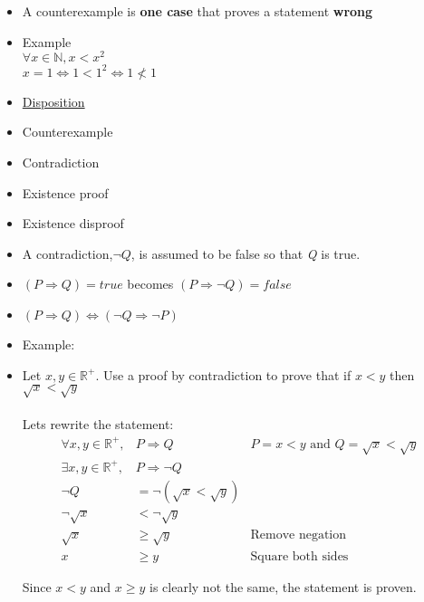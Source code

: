 \documentclass[english,10pt,a4paper]{article}
\begin{document}
\begin{minipage}{0.7\linewidth}
\begin{theo}[Counterexample] 
\begin{itemize}
\item A counterexample is \textbf{one case} that proves a statement \textbf{wrong}
\item Example
\\
$\forall x \in \mathbb{N}, x < x^2$ \\
$x=1 \Leftrightarrow 1 < 1^2 \Leftrightarrow 1 \not < 1$
\end{itemize}
\end{theo}
\end{minipage}
\hspace{0.1cm}
\begin{minipage}{0.25\linewidth}
\begin{itemize}
\item[] \underline{Disposition} 
\item Counterexample
\item Contradiction
\item Existence proof
\item Existence disproof
\end{itemize}
\end{minipage}

\begin{theo} 
\begin{itemize}
\item A contradiction,$\neg Q$, is assumed to be false so that \textit{Q} is true.
\item[] $(P \Rightarrow Q) = true$ becomes $(P \Rightarrow \neg Q) = false$
\item[] $(P \Rightarrow Q) \Leftrightarrow (\neg Q \Rightarrow \neg P)$
\item Example:
\item[] Let $x, y \in \mathbb{R}^{+}$. Use a proof by contradiction to prove that if $x<y$ then $\sqrt{x} < \sqrt{y}$
\\
\\
Lets rewrite the statement:
\begin{align}
\forall x, y \in \mathbb{R}^+, &P \Rightarrow Q & P = x < y \text{ and } Q = \sqrt{x}<\sqrt{y} \\
\exists x, y \in \mathbb{R}^+, &P \Rightarrow \neg Q \\
\neg Q &= \neg(\sqrt{x} < \sqrt{y})\\
\neg\sqrt{x} &< \neg \sqrt{y} \\
\sqrt{x} &\geq \sqrt{y} & \text{Remove negation}\\
x &\geq y & \text{Square both sides}
\end{align}

Since $x<y$ and $x\geq y$ is clearly not the same, the statement is proven.
\end{itemize}
\end{theo}
\end{document}
